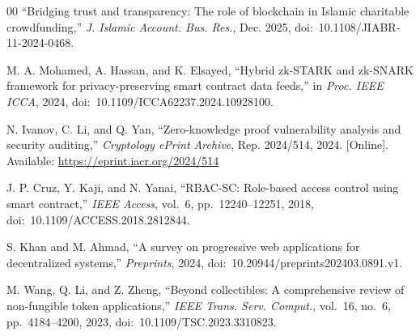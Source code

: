 \documentclass[conference]{IEEEtran}
\begin{document}
\begin{thebibliography}{00}
``Bridging trust and transparency: The role of blockchain in Islamic charitable crowdfunding,'' \textit{J. Islamic Account. Bus. Res.}, Dec. 2025, doi:~10.1108/JIABR-11-2024-0468.

M. A. Mohamed, A. Hassan, and K. Elsayed, ``Hybrid zk-STARK and zk-SNARK framework for privacy-preserving smart contract data feeds,'' in \textit{Proc. IEEE ICCA}, 2024, doi:~10.1109/ICCA62237.2024.10928100.

N. Ivanov, C. Li, and Q. Yan, ``Zero-knowledge proof vulnerability analysis and security auditing,'' \textit{Cryptology ePrint Archive}, Rep. 2024/514, 2024. [Online]. Available: \url{https://eprint.iacr.org/2024/514}

J. P. Cruz, Y. Kaji, and N. Yanai, ``RBAC-SC: Role-based access control using smart contract,'' \textit{IEEE Access}, vol.~6, pp.~12240--12251, 2018, doi:~10.1109/ACCESS.2018.2812844.

S. Khan and M. Ahmad, ``A survey on progressive web applications for decentralized systems,'' \textit{Preprints}, 2024, doi:~10.20944/preprints202403.0891.v1.

M. Wang, Q. Li, and Z. Zheng, ``Beyond collectibles: A comprehensive review of non-fungible token applications,'' \textit{IEEE Trans. Serv. Comput.}, vol.~16, no.~6, pp.~4184--4200, 2023, doi:~10.1109/TSC.2023.3310823.

\end{thebibliography}
\end{document}
